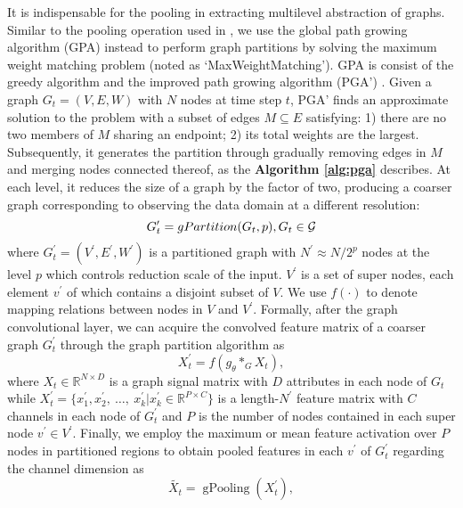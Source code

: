 \documentclass[sigconf,screen]{acmart}
\begin{document}
It is indispensable for the pooling in extracting multilevel abstraction of graphs. Similar to the pooling operation used in \cite{defferrard2016convolutional}, we use the global path growing algorithm (GPA) \cite{maue2007engineering} instead to perform graph partitions by solving the maximum weight matching problem (noted as `MaxWeightMatching'). GPA is consist of the greedy algorithm and the improved path growing algorithm (PGA') \cite{drake2003linear}. Given a graph $G_t = (V, E, W)$ with $N$ nodes at time step $t$, PGA' finds an approximate solution to the problem with a subset of edges $M \subseteq E$ satisfying: 1) there are no two members of $M$ sharing an endpoint; 2) its total weights are the largest. Subsequently, it generates the partition through gradually removing edges in $M$ and merging nodes connected thereof, as the \textbf{Algorithm \ref{alg:pga}} describes. At each level, it reduces the size of a graph by the factor of two, producing a coarser graph corresponding to observing the data domain at a different resolution:
\begin{equation}
G^{\prime}_t = gPartition(G_t, p), G_t \in \mathcal{G}\\
\end{equation}
where $G^{\prime}_t = (V^{\prime}, E^{\prime}, W^{\prime})$ is a partitioned graph with $N^{\prime} \approx N/2^{p}$ nodes at the level $p$ which controls reduction scale of the input. $V^{\prime}$ is a set of super nodes, each element $v^{\prime}$ of which contains a disjoint subset of $V$. We use $f(\cdot)$ to denote mapping relations between nodes in $V$ and $V^{\prime}$. Formally, after the graph convolutional layer, we can acquire the convolved feature matrix of a coarser graph $G^{\prime}_t$ through the graph partition algorithm as
\begin{equation}
X_t^{\prime} = f(g_{\theta} *_G X_t),
\end{equation}
where $X_t \in \mathbb{R}^{N \times D}$ is a graph signal matrix with $D$ attributes in each node of $G_t$ while $X_t^{\prime} = \lbrace x_1^{\prime}, x_2^{\prime},~\ldots,~x_k^{\prime} | x_k^{\prime} \in \mathbb{R}^{P \times C} \rbrace$ is a length-$N^{\prime}$ feature matrix with $C$ channels in each node of $G^{\prime}_t$ and $P$ is the number of nodes contained in each super node $v^{\prime} \in V^{\prime}$. Finally, we employ the maximum or mean feature activation over $P$ nodes in partitioned regions to obtain pooled features in each $v^{\prime}$ of $G^{\prime}_t$ regarding the channel dimension as
\begin{equation}
\widetilde{X_t} = \operatorname{gPooling} (X_t^{\prime}),
\end{equation}
\end{document}

